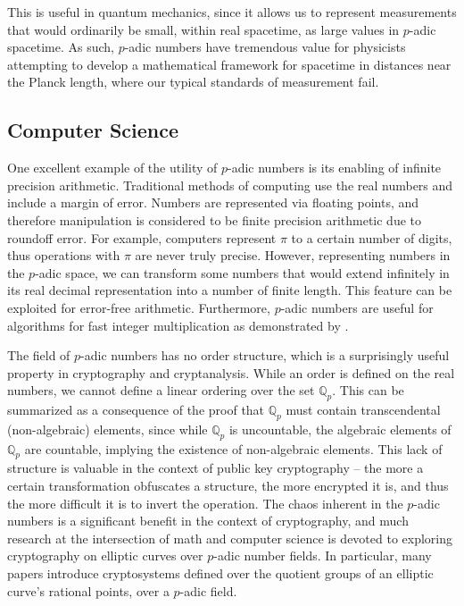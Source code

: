 \documentclass[a4paper]{article}
\begin{document}
This is useful in quantum mechanics, since it allows us to represent measurements that would ordinarily be small, within real spacetime, as large values in $p$-adic spacetime. As such, $p$-adic numbers have tremendous value for physicists attempting to develop a mathematical framework for spacetime in distances near the Planck length, where our typical standards of measurement fail. 

\subsection{Computer Science}
One excellent example of the utility of $p$-adic numbers is its enabling of infinite precision arithmetic. Traditional methods of computing use the real numbers and include a margin of error. Numbers are represented via floating points, and therefore manipulation is considered to be finite precision arithmetic due to roundoff error. For example, computers represent $\pi$ to a certain number of digits, thus operations with $\pi$ are never truly precise. However, representing numbers in the $p$-adic space, we can transform some numbers that would extend infinitely in its real decimal representation into a number of finite length. This feature can be exploited for error-free arithmetic. Furthermore, $p$-adic numbers are useful for algorithms for fast integer multiplication as demonstrated by \cite{de}.


The field of $p$-adic numbers has no order structure, which is a surprisingly useful property in cryptography and cryptanalysis. While an order is defined on the real numbers, we cannot define a linear ordering over the set $\mathbb{Q}_p$. This  can be summarized as a consequence of the proof that $\mathbb{Q}_p$ must contain transcendental (non-algebraic) elements, since while $\mathbb{Q}_p$ is uncountable, the algebraic elements of $\mathbb{Q}_p$ are countable, implying the existence of non-algebraic elements. This lack of structure is valuable in the context of public key cryptography -- the more a certain transformation obfuscates a structure, the more encrypted it is, and thus the more difficult it is to invert the operation. The chaos inherent in the $p$-adic numbers is a significant benefit in the context of cryptography, and much research at the intersection of math and computer science is devoted to exploring cryptography on elliptic curves over $p$-adic number fields. In particular, many papers introduce cryptosystems defined over the quotient groups of an elliptic curve's rational points, over a $p$-adic field. 
\end{document}
